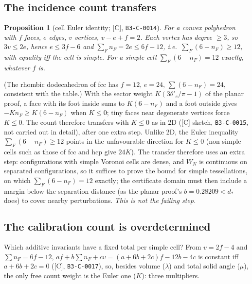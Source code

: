 \documentclass[10pt]{article}
\newcommand{\tier}[1]{\textsf{[#1]}}
\newcommand{\cid}[1]{\texttt{B3-#1}}
\newtheorem{proposition}{Proposition}
\theoremstyle{remark}
\begin{document}
\subsection{The incidence count transfers}\label{sec:euler}
\begin{proposition}[cell Euler identity; \tier{C}, \cid{C-0014}]
For a convex polyhedron with $f$ faces, $e$ edges, $v$ vertices, $v-e+f=2$. Each vertex has degree $\ge3$, so $3v\le2e$, hence $e\le3f-6$ and $\sum_Fn_F=2e\le6f-12$, i.e.\ $\sum_F(6-n_F)\ge12$, with equality iff the cell is simple. For a simple cell $\sum_F(6-n_F)=12$ exactly, whatever $f$ is.
\end{proposition}
(The rhombic dodecahedron of fcc has $f=12$, $e=24$, $\sum(6-n_F)=24$, consistent with the table.) With the sector weight $K(3\theta'_e/\pi-1)$ of the planar proof, a face with its foot inside sums to
$K(6-n_F)$ and a foot outside gives $-Kn_F\ge K(6-n_F)$ when $K\le0$; tiny faces near degenerate vertices force $K\le0$. The count therefore transfers
with $K\le0$ as in 2D (\tier{C} sketch, \cid{C-0015}, not carried out in detail), after one extra step. Unlike 2D, the Euler inequality $\sum_F(6-n_F)\ge12$ points in the unfavourable direction for $K\le0$ (non-simple cells such as those of fcc and hcp give $24K$). The transfer therefore uses an extra step: configurations with simple Voronoi cells are dense, and $W_N$ is continuous on separated configurations, so it suffices to prove the bound for simple tessellations, on which $\sum_F(6-n_F)=12$ exactly; the certificate domain must then include a margin below the separation distance (as the planar proof's $b=0.28209<d_*$ does) to cover nearby perturbations. \emph{This is not the failing step.}

\subsection{The calibration count is overdetermined}\label{sec:count}
Which additive invariants have a fixed total per simple cell? From $v=2f-4$ and $\sum n_F=6f-12$, $af+b\sum n_F+cv=(a+6b+2c)f-12b-4c$ is constant iff $a+6b+2c=0$ (\tier{C}, \cid{C-0017}),
so, besides volume ($\lambda$) and total solid angle ($\mu$), the only free count weight is the Euler one ($K$): three multipliers.
\end{document}
